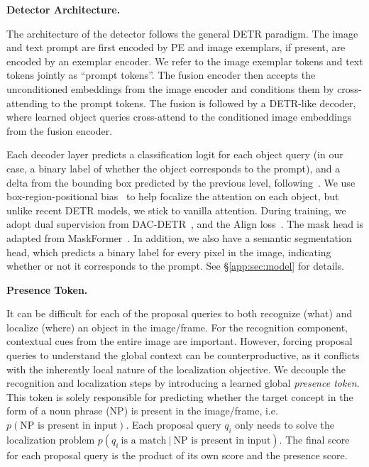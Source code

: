 \documentclass[]{fairmeta}
\renewcommand{\paragraph}[1]{%
	\noindent\textbf{#1.}\noindent\xspace%
}
\begin{document}
\paragraph{Detector Architecture}
\label{sec:detector_overview}
The architecture of the detector follows the general DETR paradigm. The image and text prompt are first encoded by PE and image exemplars, if present, are encoded by an exemplar encoder. We refer to the image exemplar tokens and text tokens jointly as ``prompt tokens''.
The fusion encoder then accepts the unconditioned embeddings from the image encoder and conditions them by cross-attending to the prompt tokens.
The fusion is followed by a DETR-like decoder, where learned object queries cross-attend to the conditioned image embeddings from the fusion encoder. 

Each decoder layer predicts a classification logit for each object query (in our case, a binary label of whether the object corresponds to the prompt), and a delta from the bounding box predicted by the previous level, following~\cite{deformabledetr}. We use box-region-positional bias~\citep{plaindetr} to help focalize the attention on each object, but unlike recent DETR models, we stick to vanilla attention. During training, we adopt dual supervision from DAC-DETR~\citep{NEURIPS2023_edd0d433}, and the Align loss~\citep{aligndetr}. The mask head is adapted from MaskFormer~\citep{cheng2021maskformer}. In addition, we also have a semantic segmentation head, which predicts a binary label for every pixel in the image, indicating whether or not it corresponds to the prompt. 
See \S\ref{app:sec:model} for details.


\paragraph{Presence Token} 
It can be difficult for each of the proposal queries to both recognize (what) and localize (where) an object in the image/frame. For the recognition component, contextual cues from the entire image are important. However, forcing proposal queries to understand the global context can be counterproductive, as it conflicts with the inherently local nature of the localization objective.
We decouple the recognition and localization steps by introducing a learned global \textit{presence token}. This token is solely responsible for predicting whether the target concept in the form of a noun phrase (NP) is present in the image/frame, i.e. $p(\text{NP is present in input})$. Each proposal query $q_i$ only needs to solve the localization problem $p(q_i~\text{is a match}~|~\text{NP is present in input})$. The final score for each proposal query is the product of its own score and the presence score.
\end{document}

